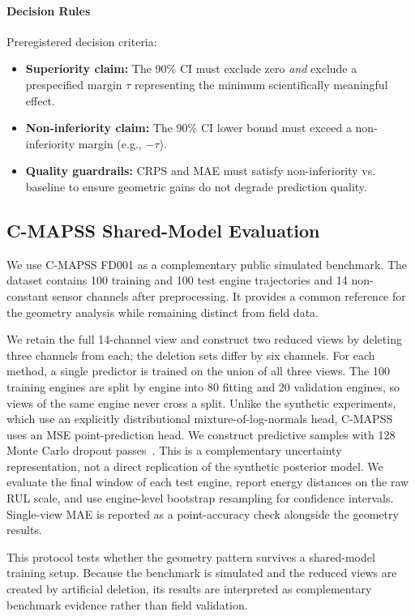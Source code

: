 \paragraph{Decision Rules}
Preregistered decision criteria:
\begin{itemize}
    \item \textbf{Superiority claim:} The 90\% CI must exclude zero \emph{and} exclude a prespecified margin $\tau$ representing the minimum scientifically meaningful effect.
    \item \textbf{Non-inferiority claim:} The 90\% CI lower bound must exceed a non-inferiority margin (e.g., $-\tau$).
    \item \textbf{Quality guardrails:} CRPS and MAE must satisfy non-inferiority vs. baseline to ensure geometric gains do not degrade prediction quality.
\end{itemize}

\subsection{C-MAPSS Shared-Model Evaluation}
\label{sec:methods:cmapss}

We use C-MAPSS FD001 as a complementary public simulated benchmark. The dataset
contains 100 training and 100 test engine trajectories and 14 non-constant sensor
channels after preprocessing. It provides a common reference for the geometry
analysis while remaining distinct from field data.

We retain the full 14-channel view and construct two reduced views by deleting
three channels from each; the deletion sets differ by six channels. For each method,
a single predictor is trained on the union of all three views. The 100 training
engines are split by engine into 80 fitting and 20 validation engines, so views of
the same engine never cross a split. Unlike the synthetic experiments, which use an
explicitly distributional mixture-of-log-normals head, C-MAPSS uses an MSE
point-prediction head. We construct predictive samples with 128 Monte Carlo dropout
passes~\citep{gal2016dropout}. This is a complementary uncertainty representation,
not a direct replication of the synthetic posterior model. We evaluate the final
window of each test engine, report energy distances on the raw RUL scale, and use
engine-level bootstrap resampling for confidence intervals. Single-view MAE is
reported as a point-accuracy check alongside the geometry results.

This protocol tests whether the geometry pattern survives a shared-model training
setup. Because the benchmark is simulated and the reduced views are created by
artificial deletion, its results are interpreted as complementary benchmark evidence
rather than field validation.

